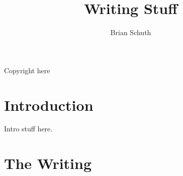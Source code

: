 \documentclass[draft,10pt,openany,800paper]{kdp}  %
\title{Writing Stuff}
\author{Brian Schuth}
\begin{document}
\frontmatter
Copyright here

\tableofcontents

\mainmatter
\part{Introduction}

Intro stuff here.

\part{The Writing}














\end{document}
